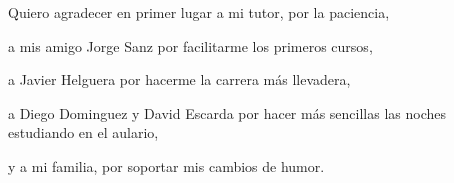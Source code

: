 Quiero agradecer en primer lugar a mi tutor, por la paciencia,

a mis amigo Jorge Sanz por facilitarme los primeros cursos,

a Javier Helguera por hacerme la carrera más llevadera,

a Diego Dominguez y David Escarda por hacer más sencillas las noches estudiando en el aulario,

y a mi familia, por soportar mis cambios de humor.